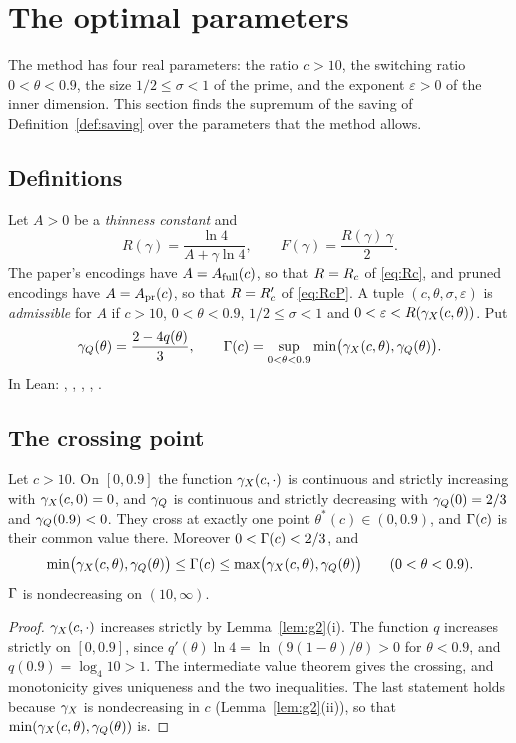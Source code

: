\section{The optimal parameters}
\label{sec:optimum}

The method has four real parameters: the ratio \(c>10\), the switching ratio
\(0<\theta<0.9\), the size \(1/2\le\sigma<1\) of the prime, and the exponent
\(\varepsilon>0\) of the inner dimension.  This section finds the supremum of
the saving of Definition~\ref{def:saving} over the parameters that the method
allows.

\subsection{Definitions}

Let \(A>0\) be a \emph{thinness constant} and
\[
  R(\gamma)=\frac{\ln 4}{A+\gamma\ln 4},\qquad F(\gamma)=\frac{R(\gamma)\,\gamma}{2}.
\]
The paper's encodings have \(A=A_{\mathrm{full}}(c)\), so that \(R=R_{c}\) of \eqref{eq:Rc},
and pruned encodings have \(A=A_{\mathrm{pr}}(c)\), so that \(R=R'_{c}\) of \eqref{eq:RcP}.
A tuple \((c,\theta,\sigma,\varepsilon)\) is \emph{admissible} for \(A\) if
\(c>10\), \(0<\theta<0.9\), \(1/2\le\sigma<1\) and
\(0<\varepsilon<R(\gamma_{X}(c,\theta))\).  Put
\[
  \gamma_{Q}(\theta)=\frac{2-4q(\theta)}{3},\qquad
  \Gamma(c)=\sup_{0<\theta<0.9}\min\bigl(\gamma_{X}(c,\theta),\gamma_{Q}(\theta)\bigr).
\]
In Lean: , , , ,
.

\subsection{The crossing point}

\begin{lemma}\label{lem:crossing}
Let \(c>10\).  On \([0,0.9]\) the function \(\gamma_{X}(c,\cdot)\) is continuous and
strictly increasing with \(\gamma_{X}(c,0)=0\), and \(\gamma_{Q}\) is continuous and strictly
decreasing with \(\gamma_{Q}(0)=2/3\) and \(\gamma_{Q}(0.9)<0\).  They cross at exactly one
point \(\theta^{*}(c)\in(0,0.9)\), and \(\Gamma(c)\) is their common value there.
Moreover \(0<\Gamma(c)<2/3\), and
\[
  \min\bigl(\gamma_{X}(c,\theta),\gamma_{Q}(\theta)\bigr)\le\Gamma(c)
  \le\max\bigl(\gamma_{X}(c,\theta),\gamma_{Q}(\theta)\bigr)\qquad(0<\theta<0.9).
\]
\(\Gamma\) is nondecreasing on \((10,\infty)\).
\end{lemma}

\begin{proof}
\(\gamma_{X}(c,\cdot)\) increases strictly by Lemma~\ref{lem:g2}(i).  The function
\(q\) increases strictly on \([0,0.9]\), since
\(q'(\theta)\ln 4=\ln(9(1-\theta)/\theta)>0\) for \(\theta<0.9\), and
\(q(0.9)=\log_4 10>1\).  The intermediate value theorem gives the crossing, and
monotonicity gives uniqueness and the two inequalities.  The last statement
holds because \(\gamma_{X}\) is nondecreasing in \(c\) (Lemma~\ref{lem:g2}(ii)), so
that \(\min(\gamma_{X}(c,\theta),\gamma_{Q}(\theta))\) is.
\end{proof}

